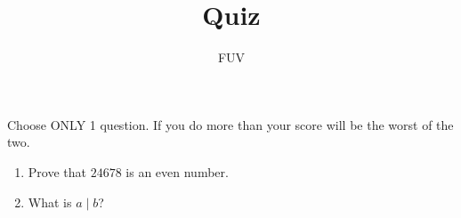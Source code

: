 \documentclass[aspectratio=169]{beamer}
\title{ Quiz }
\author{FUV}
\begin{document}
\frame{\titlepage}
\begin{frame}
	Choose ONLY 1 question.
	If you do more than your score will be the worst of the two.
	\begin{enumerate}
		\item Prove that $24678$ is an even number.
		\item What is $a \mid b$?
	\end{enumerate}
\end{frame}



%
%
\end{document}
